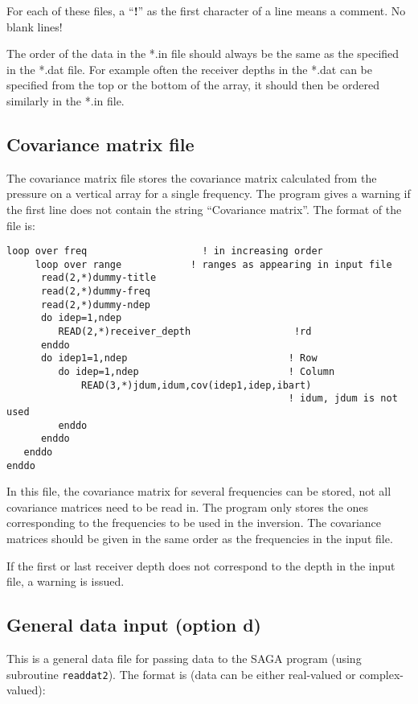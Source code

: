 \documentclass{saclantc}
\begin{document}
For each of these files, a ``{\bf !}'' as the first character of a line
means a comment.  No blank lines!


The order of the data in the *.in file 
should always be the same as the specified in the *.dat file. For
example often the receiver depths in the *.dat can be specified from
the top or the bottom of the array, it should then be ordered
similarly in the *.in file.

\subsection{Covariance matrix file}
\label{se:opt_c}
The   covariance matrix file stores  the covariance matrix calculated from
the pressure on a vertical array for a single frequency. The program gives a 
warning if the first line does not contain the string ``Covariance matrix''.
The format of the file is:

\small
\begin{verbatim}
loop over freq                    ! in increasing order
     loop over range            ! ranges as appearing in input file
      read(2,*)dummy-title
      read(2,*)dummy-freq 
      read(2,*)dummy-ndep
      do idep=1,ndep
         READ(2,*)receiver_depth                  !rd
      enddo
      do idep1=1,ndep                            ! Row
         do idep=1,ndep                          ! Column
             READ(3,*)jdum,idum,cov(idep1,idep,ibart)    
                                                 ! idum, jdum is not used 
         enddo
      enddo
   enddo
enddo
\end{verbatim}
\normalsize

In this file, the covariance matrix for several frequencies can be stored,
not all covariance matrices need to be read in. The program only
stores  the ones corresponding to the frequencies to be used in the inversion.
The covariance matrices should be given in the same order as the 
frequencies in the input file.

If the first or last receiver depth does not correspond to the
depth in the input file, a warning is issued.

\subsection{General data input (option d)}
\label{se:opt_d}
This is a  general data file for passing data to the  {\sf SAGA} program 
(using
subroutine {\tt readdat2}). 
The format is (data can be  either real-valued or complex-valued):
\end{document}
